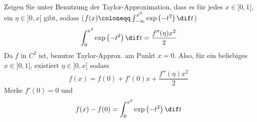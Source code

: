 \begin{example}
	Zeigen Sie unter Benutzung der Taylor-Approximation, dass es für jedes $x \in ]0,1]$, ein $\eta \in ]0,x[$ gibt,
	sodass ($f(x) \coloneqq \int_{- \infty}^{x^3} \exp \left( -t^2 \right)\dif t$)
	\begin{equation*}
		\int_{0}^{x^3} \exp \left( -t^2 \right)  \dif t = \frac{f''(\eta) x^2}{2} 
	\end{equation*}
	Da $f$ in $C^2$ ist, benutze Taylor-Approx. am Punkt $x = 0$. 
	Also, für ein beliebiges $x \in ]0,1]$, existiert $\eta \in ]0,x[$ sodass
	\begin{equation*}
		f(x) = f(0) + f'(0)x + \frac{f''(\eta) x^2}{2}
	\end{equation*}
	Merke $f'(0) = 0$ und
	\begin{equation*}
		f(x) - f(0) = \int_{0}^{x^3} \exp \left( -t^2 \right) \dif t
	\end{equation*}
\end{example}